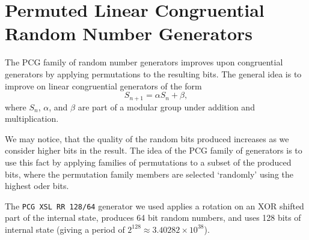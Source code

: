 \documentclass[10pt, a4paper]{article}
\begin{document}
\section{Permuted Linear Congruential Random Number Generators}
\label{app:pcg}

The PCG family of random number generators improves upon congruential generators by applying
permutations to the resulting bits\cite{pcg}. The general idea is to improve on linear congruential
generators of the form
\begin{equation}
S_{n+1} = \alpha S_n + \beta,
\end{equation}
where $S_n$, $\alpha$, and $\beta$ are part of a modular group under addition and multiplication.

We may notice, that the quality of the random bits produced increases as we consider higher bits
in the result\cite{pcg}. The idea of the PCG family of generators is to use this fact by
applying families of permutations to a subset of the produced bits, where the permutation family
members are selected `randomly' using the highest oder bits.

The \texttt{PCG XSL RR 128/64} generator we used applies a rotation on an XOR shifted part of the
internal state, produces 64 bit random numbers, and uses 128 bits of internal state (giving a
period of $2^{128} \approx 3.40282\times10^{38}$)\cite{pcg}.
\end{document}
